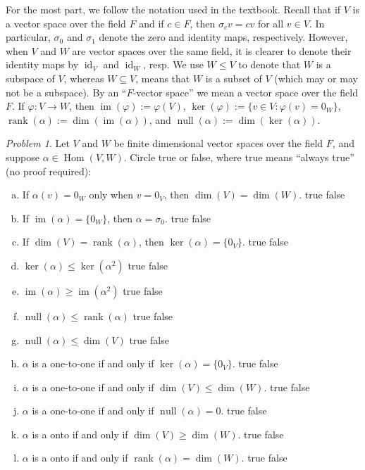 \documentclass[11pt]{paper}
\theoremstyle{remark}
\newtheorem{problem}{Problem}
\newcommand\0{\ensuremath{\mathbf{0}}}
\newcommand{\<}{\ensuremath{\langle}}
\renewcommand{\>}{\ensuremath{\rangle}}
\newcommand\Hom{\ensuremath{\operatorname{Hom}}}
\newcommand{\id}{\ensuremath{\operatorname{id}}}
\newcommand{\nulity}[1]{\ensuremath{\operatorname{null}(#1)}}
\renewcommand{\ker}[1]{\ensuremath{\operatorname{ker}(#1)}}
\renewcommand{\dim}[1]{\ensuremath{\operatorname{dim}(#1)}}
\newcommand\im[1]{\ensuremath{\operatorname{im}(#1)}}
\newcommand{\rank}[1]{\ensuremath{\operatorname{rank}(#1)}}
\renewcommand{\phi}{\ensuremath{\varphi}}
\renewcommand{\leq}{\ensuremath{\leqslant}}
\renewcommand{\geq}{\ensuremath{\geqslant}}
\begin{document}
\medskip

For the most part, we follow the notation used in the textbook.
Recall that if $V$ is a vector space over the field $F$ and if
$c\in F$, then $\sigma_c v = cv$ for all $v \in V$.
In particular, $\sigma_0$ and $\sigma_1$ denote the zero and identity maps,
respectively. However, when $V$ and $W$ are vector spaces over the same field,
it is clearer to denote their identity maps by $\id_V$ and $\id_W$, resp.
We use $W\leq V$ to denote that $W$ is a subspace of $V$, 
whereas $W\subseteq V$, means that $W$ is a subset of $V$ 
(which may or may not be a subspace).  By an ``$F$-vector space'' we mean a
vector space over the field $F$. If $\phi : V \rightarrow W$, then
$\im{\phi} := \phi(V)$, $\ker{\phi} := \{v \in V : \phi(v) = 0_W\}$,
$\rank{\alpha} := \dim{\im{\alpha}}$, and $\nulity{\alpha} := \dim{\ker{\alpha}}$.
\probskip

\begin{problem}
Let $V$ and $W$ be finite dimensional vector spaces over the field $F$, and
suppose $\alpha \in \Hom(V,W)$.
Circle true or false, where true means ``always true'' (no proof required):
\begin{enumerate}[(a)]
\item If $\alpha(v) = 0_W$ only when $v=0_V$, then $\dim{V} = \dim{W}$.
 \hfill true \hskip1cm false
\item If $\im{\alpha} = \{0_W\}$, then $\alpha = \sigma_0$.
 \hfill true \hskip1cm false
\item If $\dim{V} = \rank{\alpha}$, then $\ker{\alpha} = \{0_V\}$.
 \hfill true \hskip1cm false
\item $\ker{\alpha}\leq \ker{\alpha^2}$
 \hfill true \hskip1cm false
\item $\im{\alpha}\geq \im{\alpha^2}$
 \hfill true \hskip1cm false
\item $\nulity{\alpha} \leq \rank{\alpha}$
 \hfill true \hskip1cm false
\item $\nulity{\alpha} \leq \dim{V}$
 \hfill true \hskip1cm false
\item $\alpha$ is a one-to-one if and only if $\ker{\alpha} = \{0_V\}$.
 \hfill true \hskip1cm false
\item $\alpha$ is a one-to-one if and only if $\dim{V} \leq \dim{W}$.
 \hfill true \hskip1cm false
\item $\alpha$ is a one-to-one if and only if $\nulity{\alpha} = 0$.
 \hfill true \hskip1cm false
\item $\alpha$ is a onto if and only if $\dim{V} \geq \dim{W}$.
 \hfill true \hskip1cm false
\item $\alpha$ is a onto if and only if $\rank{\alpha} =\dim{W}$.
 \hfill true \hskip1cm false
\end{enumerate}
\end{problem}
\end{document}
